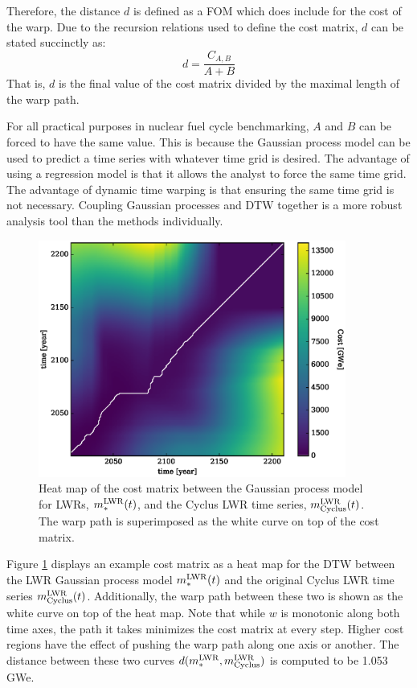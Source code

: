 Therefore, the distance $d$ is defined as a FOM which does include for the cost of the
warp.  Due to the recursion relations used to define the cost matrix, $d$ can be 
stated succinctly as:
\begin{equation}
\label{d-calc}
d = \frac{C_{A,B}}{A + B}
\end{equation}
That is, $d$ is the final value of the cost matrix divided by the maximal length 
of the warp path.

For all practical purposes in nuclear fuel cycle benchmarking, $A$ and $B$ can be 
forced to have the same
value. This is because the Gaussian process model can be used to predict a time series 
with whatever time grid is desired.  The advantage of using a regression model 
is that it allows the analyst to force the same time grid.  The advantage of 
dynamic time warping is that ensuring the same time grid is not necessary.
Coupling Gaussian processes and DTW together is a more robust analysis tool 
than the methods individually.

\begin{figure}[htb]
\centering
\includegraphics[width=0.9\textwidth]{cost-lwr-model-to-lwr-cyclus.eps}
\caption{Heat map of the cost matrix between the Gaussian process model 
for LWRs, $m_*^{\mathrm{LWR}}(t)$, and the Cyclus LWR time series, $m_{\mathrm{Cyclus}}^{\mathrm{LWR}}(t)$.
The warp path is superimposed as the white curve on top of the cost matrix.}
\label{cost-lwr-model-to-lwr-cyclus}
\end{figure}

Figure \ref{cost-lwr-model-to-lwr-cyclus} displays an example cost matrix 
as a heat map for the DTW between the LWR Gaussian process model 
$m_*^{\mathrm{LWR}}(t)$ and the original Cyclus LWR time series $m_{\mathrm{Cyclus}}^{\mathrm{LWR}}(t)$.
Additionally, the warp path between these two is shown as the white curve
on top of the heat map. Note that while $w$ is monotonic along both time axes, the
path it takes minimizes the cost matrix at every step. Higher cost regions
have the effect of pushing the warp path along one axis or another. The 
distance between these two curves $d(m_*^{\mathrm{LWR}}, m_{\mathrm{Cyclus}}^{\mathrm{LWR}})$ is computed 
to be 1.053 GWe.

